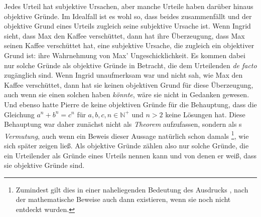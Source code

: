 Jedes Urteil hat subjektive Ursachen, aber manche Urteile haben darüber hinaus
objektive Gründe. Im Idealfall ist es wohl so, dass beides zusammenfällt und
der objektive Grund eines Urteils zugleich seine subjektive Ursache ist.
Wenn Ingrid sieht, dass Max den Kaffee verschüttet, dann hat ihre Überzeugung,
dass Max seinen Kaffee verschüttet hat, eine subjektive Ursache, die zugleich ein
objektiver Grund ist: ihre Wahrnehmung von Max' Ungeschicklichkeit. Es kommen
dabei nur solche Gründe als objektive Gründe in Betracht, die dem Urteilenden
\emph{de facto} zugänglich sind. Wenn Ingrid unaufmerksam war und nicht sah, wie
Max den Kaffee verschüttet, dann hat sie keinen objektiven Grund für diese
Überzeugung, auch wenn sie einen solchen haben \emph{könnte}, wäre sie nicht in
Gedanken gewesen. Und ebenso hatte Pierre de  keine
objektiven Gründe für die Behauptung, dass die Gleichung $a^n + b^n = c^n$ für
$a,b,c,n \in \mathbb{N}^{+}$ und $n > 2$ keine Lösungen hat. Diese Behauptung
war daher zunächst nicht als \emph{Theorem} aufzufassen, sondern als
s \emph{Vermutung}, auch wenn ein Beweis dieser Aussage
natürlich schon damals \footnote{Zumindest gilt dies in einer naheliegenden
Bedeutung des Ausdrucks , nach der mathematische
Beweise auch dann existieren, wenn sie noch nicht entdeckt wurden.}, wie sich
später zeigen ließ.
Als objektive Gründe zählen also nur solche Gründe, die ein Urteilender als
Gründe eines Urteils nennen kann und von denen er weiß, dass sie objektive
Gründe sind.

